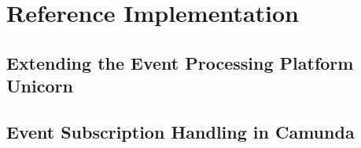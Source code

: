 \chapter{Reference Implementation}\label{ch:implementation}

\section{Extending the Event Processing Platform Unicorn}\label{ch:implunicorn}

\section{Event Subscription Handling in Camunda}\label{ch:implcamunda}